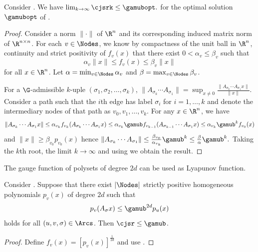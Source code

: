 \documentclass[11pt,twoside,a4paper,openright]{uclouvain-thesis}
\begin{document}
\begin{mytheo}
  \label{theo:stabcert}
  Consider .
  We have
  \( \lim_{k \to \infty} \cjsrk \leq \gamubopt. \)
  for the optimal solution $\gamubopt$ of .
  \begin{proof}
    Consider a norm $\|\cdot\|$ of $\R^n$ and its corresponding induced matrix norm of $\R^{n \times n}$.
    For each $v \in \Nodes$, we know by compactness of the unit ball in $\R^n$, continuity and strict positivity of $f_v(x)$ that there exist $0 < \alpha_v \leq \beta_v$ such that
    \[ \alpha_v \|x\| \leq f_v(x) \leq \beta_v\|x\| \]
    for all $x \in \R^n$.
    Let $\alpha = \min_{v \in \Nodes} \alpha_v$ and $\beta = \max_{v \in \Nodes} \beta_v$.

    For a $\G$-admissible $k$-uple $(\sigma_1, \sigma_2, \ldots, \sigma_k)$,
    \( \|A_{\sigma_k} \cdots A_{\sigma_1}\| = \sup_{x \neq 0} \frac{\|A_{\sigma_k} \cdots A_{\sigma_1}x\|}{\|x\|}. \)
    Consider a path such that the $i$th edge has label $\sigma_i$ for $i = 1, \ldots, k$
    and denote the intermediary nodes of that path as $v_0, v_1, \ldots, v_k$.
    For any $x \in \R^n$, we have
    \begin{align*}
      \|A_{\sigma_k} \cdots A_{\sigma_1}x\| %
                                            \leq \alpha_{v_k} f_{v_k}(A_{\sigma_k} \cdots A_{\sigma_1} x)%
                                            \leq \alpha_{v_k} \gamub f_{v_{k-1}}(A_{\sigma_{k-1}} \cdots A_{\sigma_1} x)%
                                            \leq \alpha_{v_k} \gamub^{k} f_{v_0}(x)
    \end{align*}
    and
    \( \|x\| \geq \beta_{v_0} p_{v_0}(x) \)
    hence
    \( \|A_{\sigma_k} \cdots A_{\sigma_1}\| \leq \frac{\beta_{v_0}}{\alpha_{v_k}} \gamub^k \leq \frac{\beta}{\alpha} \gamub^k. \)
    Taking the $k$th root, the limit $k \to \infty$ and using  we obtain the result.
  \end{proof}
\end{mytheo}



The gauge function of polysets of degree $2d$ can be used as Lyapunov function.
\begin{mytheo}
  \label{prop:pos}
  Consider .
  Suppose that there exist $|\Nodes|$ strictly positive homogeneous polynomials $p_v(x)$ of degree $2d$
  such that
  \[ p_{v}(A_\sigma x) \leq \gamub^{2d}p_{u}(x) \]
  holds for all \arc{} $(u,v,\sigma) \in \Arcs$.
  Then $\cjsr \leq \gamub$.
  \begin{proof}
    Define $f_v(x) = [p_v(x)]^{\frac{1}{2d}}$ and use .
  \end{proof}
\end{mytheo}
\end{document}
